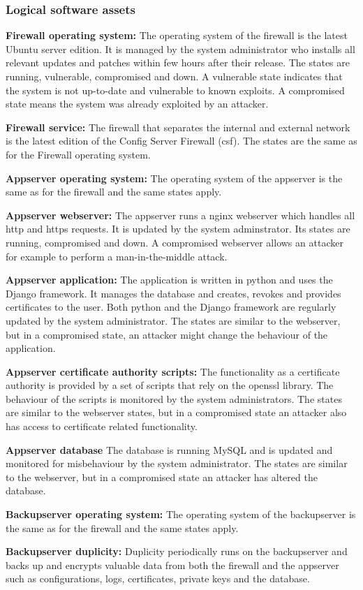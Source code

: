 \documentclass[english]{article}
\begin{document}
\subsubsection{Logical software assets}

	\begin{description}
		\item{\textbf{Firewall operating system:}} The operating system of the firewall is the latest Ubuntu server edition. It is managed by the system administrator who installs all relevant updates and patches within few hours after their release. The states are running, vulnerable, compromised and down. A vulnerable state indicates that the system is not up-to-date and vulnerable to known exploits. A compromised state means the system was already exploited by an attacker.
		\item{\textbf{Firewall service:}} The firewall that separates the internal and external network is the latest edition of the Config Server Firewall (csf). The states are the same as for the Firewall operating system.
		\item{\textbf{Appserver operating system:}} The operating system of the appserver is the same as for the firewall and the same states apply.
		\item{\textbf{Appserver webserver:}} The appserver runs a nginx webserver which handles all http and https requests. It is updated by the system adminstrator. Its states are running, compromised and down. A compromised webserver allows an attacker for example to perform a man-in-the-middle attack.
		\item{\textbf{Appserver application:}} The application is written in python and uses the Django framework. It manages the database and creates, revokes and provides certificates to the user. Both python and the Django framework are regularly updated by the system administrator. The states are similar to the webserver, but in a compromised state, an attacker might change the behaviour of the application.
		\item{\textbf{Appserver certificate authority scripts:}} The functionality as a certificate authority is provided by a set of scripts that rely on the openssl library. The behaviour of the scripts is monitored by the system administrators. The states are similar to the webserver states, but in a compromised state an attacker also has access to certificate related functionality.
		\item{\textbf{Appserver database}} The database is running MySQL and is updated and monitored for misbehaviour by the system administrator. The states are similar to the webserver, but in a compromised state an attacker has altered the database.
		\item{\textbf{Backupserver operating system:}} The operating system of the backupserver is the same as for the firewall and the same states apply.
		\item{\textbf{Backupserver duplicity:}} Duplicity periodically runs on the backupserver and backs up and encrypts valuable data from both the firewall and the appserver such as configurations, logs, certificates, private keys and the database.
	\end{description}
\end{document}
